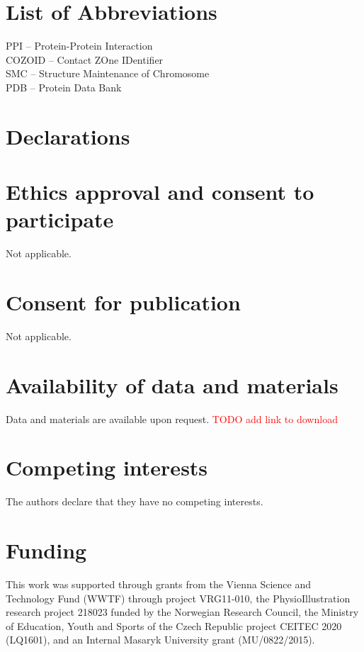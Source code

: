 \documentclass{bmcart}
\begin{document}
\section*{List of Abbreviations}
\begin{backmatter}
PPI -- Protein-Protein Interaction \\
COZOID -- Contact ZOne IDentifier \\
SMC -- Structure Maintenance of Chromosome \\
PDB -- Protein Data Bank \\
\end{backmatter}

\section*{Declarations}
\begin{backmatter}

\section*{Ethics approval and consent to participate}
Not applicable.

\section*{Consent for publication}
Not applicable.

\section*{Availability of data and materials}
Data and materials are available upon request. \textcolor{red}{TODO add link to download}

\section*{Competing interests}
  The authors declare that they have no competing interests.
	
\section*{Funding}
This work was supported through grants from the Vienna Science and Technology Fund (WWTF) through project VRG11-010, the PhysioIllustration research project 218023 funded by the Norwegian Research Council, the Ministry of Education, Youth and Sports of the Czech Republic project CEITEC 2020 (LQ1601), and an Internal Masaryk University grant (MU/0822/2015). 


\end{backmatter}
\end{document}
